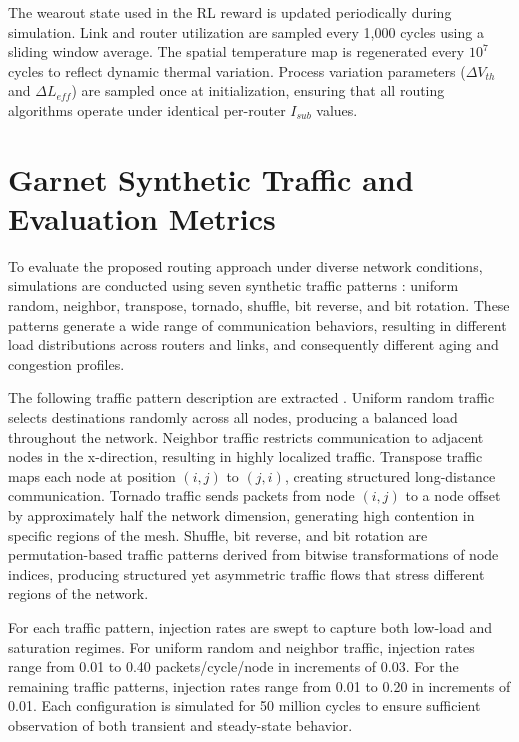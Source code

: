 The wearout state used in the RL reward is updated periodically during simulation. Link and router utilization are sampled every 1,000 cycles using a sliding window average. The spatial temperature map is regenerated every $10^7$ cycles to reflect dynamic thermal variation. Process variation parameters ($\Delta V_{th}$ and $\Delta L_{eff}$) are sampled once at initialization, ensuring that all routing algorithms operate under identical per-router $I_{sub}$ values.

\section{Garnet Synthetic Traffic and Evaluation Metrics}

To evaluate the proposed routing approach under diverse network conditions, simulations are conducted using seven synthetic traffic patterns \cite{Malikov2025}: uniform random, neighbor, transpose, tornado, shuffle, bit reverse, and bit rotation. These patterns generate a wide range of communication behaviors, resulting in different load distributions across routers and links, and consequently different aging and congestion profiles.

The following traffic pattern description are extracted \cite{Malikov2025}. Uniform random traffic selects destinations randomly across all nodes, producing a balanced load throughout the network. Neighbor traffic restricts communication to adjacent nodes in the x-direction, resulting in highly localized traffic. Transpose traffic maps each node at position $(i,j)$ to $(j,i)$, creating structured long-distance communication. Tornado traffic sends packets from node $(i,j)$ to a node offset by approximately half the network dimension, generating high contention in specific regions of the mesh. Shuffle, bit reverse, and bit rotation are permutation-based traffic patterns derived from bitwise transformations of node indices, producing structured yet asymmetric traffic flows that stress different regions of the network.

For each traffic pattern, injection rates are swept to capture both low-load and saturation regimes. For uniform random and neighbor traffic, injection rates range from 0.01 to 0.40 packets/cycle/node in increments of 0.03. For the remaining traffic patterns, injection rates range from 0.01 to 0.20 in increments of 0.01. Each configuration is simulated for 50 million cycles to ensure sufficient observation of both transient and steady-state behavior.

